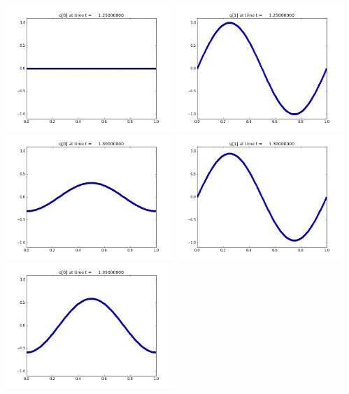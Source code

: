 \documentclass[11pt]{article}
\begin{document}
\vskip 10pt 
\includegraphics[width=0.475\textwidth]{frame0025fig0.png}
\includegraphics[width=0.475\textwidth]{frame0025fig1.png}
\vskip 10pt 
\includegraphics[width=0.475\textwidth]{frame0026fig0.png}
\includegraphics[width=0.475\textwidth]{frame0026fig1.png}
\vskip 10pt 
\includegraphics[width=0.475\textwidth]{frame0027fig0.png}
\end{document}
